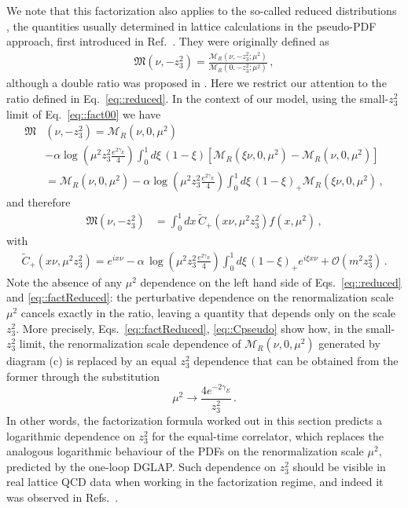 We note that this factorization also applies to the so-called reduced
distributions \cite{Zhang:2018ggy,Radyushkin:2018cvn}, the quantities usually
determined in lattice calculations in the pseudo-PDF approach, first introduced
in Ref.~\cite{Radyushkin:2017cyf}. They were originally defined as
\begin{align}
\label{eq::reduced}
	\mathfrak{M}\left(\nu,-z_3^2\right) =
	\frac{\mathcal{M}_R\left(\nu, -z_3^2; \mu^2\right)}{\mathcal{M}_R\left(0, -z_3^2; \mu^2\right)}\,,
\end{align}
although a double ratio was proposed in \cite{Orginos:2017kos}. Here we restrict our attention to the ratio defined in Eq.~\eqref{eq::reduced}.
In the context of our model, using the small-$z_3^2$ limit of Eq.~\eqref{eq::fact00} we have
\begin{align}
	\mathfrak{M}&\left(\nu,-z_3^2\right) = 
	\mathcal{M}_R\left(\nu,0, \mu^2\right)   \nonumber\\
	&-\alpha \log\left( \mu^2 z_3^2\frac{e^{2\gamma_E}}{4} \right) \int_0^1 d\xi\,\left(1-\xi\right)  
	\left[\mathcal{M}_R\left(\xi \nu,0,\mu^2\right)- \mathcal{M}_R\left(\nu,0,\mu^2\right) \right] \nonumber \\
	& = \mathcal{M}_R\left(\nu, 0, \mu^2\right)  
	-\alpha \log\left( \mu^2 z_3^2\frac{e^{2\gamma_E}}{4} \right) \int_0^1 d\xi\,\left(1-\xi\right)_+ 
	\mathcal{M}_R\left(\xi \nu,0, \mu^2\right)\, ,
\end{align}
and therefore
\begin{align}
	\label{eq::factReduced}
	\mathfrak{M}\left(\nu,-z_3^2\right) &=  
	\int_{0}^{1} dx \, \tilde{C}_+\left(x\nu,\mu^2 z_3^2 \right) f\left(x,\mu^2\right)\,,
\end{align}
with
\begin{align}
	\label{eq::Cpseudo}
	\tilde{C}_+\left(x\nu,\mu^2 z_3^2 \right) =
	 e^{i x\nu} - \alpha\,\log\left( \mu^2 z_3^2\frac{e^{2\gamma_E}}{4} \right)
	 \int_0^1 d\xi \, \left(1-\xi\right)_+ e^{i \xi x\nu} + \mathcal{O}\left(m^2 z_3^2\right)\, .
\end{align}
Note the absence of any $\mu^2$ dependence on the left hand side of
Eqs.~\eqref{eq::reduced} and \eqref{eq::factReduced}: the perturbative
dependence on the renormalization scale $\mu^2$ cancels exactly in the ratio,
leaving a quantity that depends only on the scale $z_3^2$. More precisely,
Eqs.~\eqref{eq::factReduced}, \eqref{eq::Cpseudo} show how, in the small-$z_3^2$
limit, the renormalization scale dependence of
$\mathcal{M}_R\left(\nu,0,\mu^2\right)$ generated by diagram (c) is replaced by
an equal $z_3^2$ dependence that can be obtained from the former through the
substitution  
$$\mu^2 \rightarrow \frac{4 e^{-2\gamma_E}}{z_3^2}\, .$$ In other words, the
factorization formula worked out in this section predicts a logarithmic
dependence on $z_3^2$ for the equal-time correlator, which replaces the
analogous logarithmic behaviour of the PDFs on the renormalization scale
$\mu^2$, predicted by the one-loop DGLAP. Such dependence on $z_3^2$ should be
visible in real lattice QCD data when working in the factorization regime, and
indeed it was observed in Refs.~\cite{Radyushkin:2018cvn, Orginos:2017kos}.


